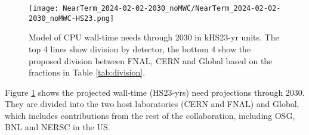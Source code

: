 \documentclass[12pt]{article}
\begin{document}



\begin{figure}[h]
\centering\texttt{[image: NearTerm\_2024-02-02-2030\_noMWC/NearTerm\_2024-02-02-2030\_noMWC-HS23.png]}
\caption{Model of CPU wall-time needs  through 2030 in  kHS23-yr units.  The top 4 lines show division by detector, the bottom 4 show the proposed division between FNAL, CERN and Global based on the fractions in Table \ref{tab:division}.}\label{fig:HS23Main}
\end{figure}


Figure   \ref{fig:HS23Main} shows the projected wall-time  (HS23-yrs) need projections through 2030.   They are divided into the two host laboratories (CERN and FNAL) and Global, which includes contributions from the rest of the collaboration, including OSG, BNL and NERSC in the US. 


%
%
%
%
%
\end{document}
